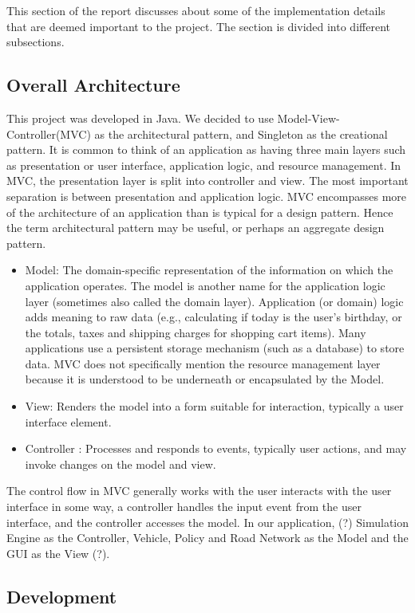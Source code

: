 \documentclass[11pt]{article}
\begin{document}
This section of the report discusses about some of the implementation details that are deemed important to the project. The section is divided into different subsections.
\subsection{Overall Architecture}
This project was developed in Java. We decided to use Model-View-Controller(MVC) as the architectural pattern, and Singleton as the creational pattern. It is common to think of an application as having three main
layers such as presentation or user interface, application logic, and resource management. In MVC, the presentation
layer is split into controller and view. The most important separation is between presentation and
application logic. MVC encompasses more of the architecture of an application than is typical for a design pattern. Hence the term architectural pattern may be useful, or perhaps an aggregate design pattern.
    \begin{itemize}
    \item Model: The domain-specific representation of the information on which the application operates.
    The model is another name for the application logic layer (sometimes also called the
    domain layer). Application (or domain) logic adds meaning to raw data (e.g., calculating if today
    is the user’s birthday, or the totals, taxes and shipping charges for shopping cart items).
    Many applications use a persistent storage mechanism (such as a database) to store data.
    MVC does not specifically mention the resource management layer because it is understood
    to be underneath or encapsulated by the Model.
    \item View: Renders the model into a form suitable for interaction, typically a user interface
    element.
    \item Controller : Processes and responds to events, typically user actions, and may invoke changes
    on the model and view.
    \end{itemize}

The control flow in MVC generally works with the user interacts with the user interface in some way, a controller handles the input event from the user interface, and the controller accesses the model. In our application, (?)
Simulation Engine as the Controller, Vehicle, Policy and Road Network as the Model and the GUI as the View (?). 


\subsection{Development}
\end{document}
